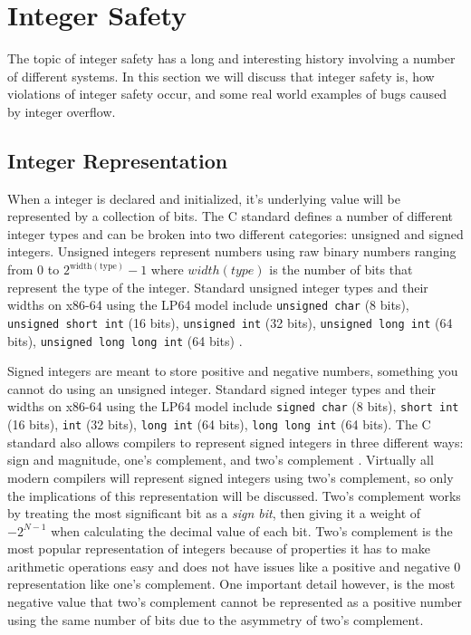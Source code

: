 \section{Integer Safety}

The topic of integer safety has a long and interesting history involving a number of different systems. In this section we will discuss that integer safety is, how violations of integer safety occur, and some real world examples of bugs caused by integer overflow.

\subsection{Integer Representation}

When a integer is declared and initialized, it's underlying value will be represented by a collection of bits. The C standard defines a number of different integer types and can be broken into two different categories: unsigned and signed integers. Unsigned integers represent numbers using raw binary numbers ranging from 0 to $2^{\text{width}(\text{type})} - 1$ where $width(type)$ is the number of bits that represent the type of the integer. Standard unsigned integer types and their widths on x86-64 using the LP64 model include \texttt{unsigned char} (8 bits), \texttt{unsigned short int} (16 bits), \texttt{unsigned int} (32 bits), \texttt{unsigned long int} (64 bits), \texttt{unsigned long long int} (64 bits) \cite{LP64}.

Signed integers are meant to store positive and negative numbers, something you cannot do using an unsigned integer. Standard signed integer types and their widths on x86-64 using the LP64 model include \texttt{signed char} (8 bits), \texttt{short int} (16 bits), \texttt{int} (32 bits), \texttt{long int} (64 bits), \texttt{long long int} (64 bits). The C standard also allows compilers to represent signed integers in three different ways: sign and magnitude, one's complement, and two's complement \cite{c_standard}. Virtually all modern compilers will represent signed integers using two's complement, so only the implications of this representation will be discussed. Two's complement works by treating the most significant bit as a \textit{sign bit}, then giving it a weight of $-2^{N - 1}$ when calculating the decimal value of each bit. Two's complement is the most popular representation of integers because of properties it has to make arithmetic operations easy and does not have issues like a positive and negative 0 representation like one's complement. One important detail however, is the most negative value that two's complement cannot be represented as a positive number using the same number of bits due to the asymmetry of two's complement.


